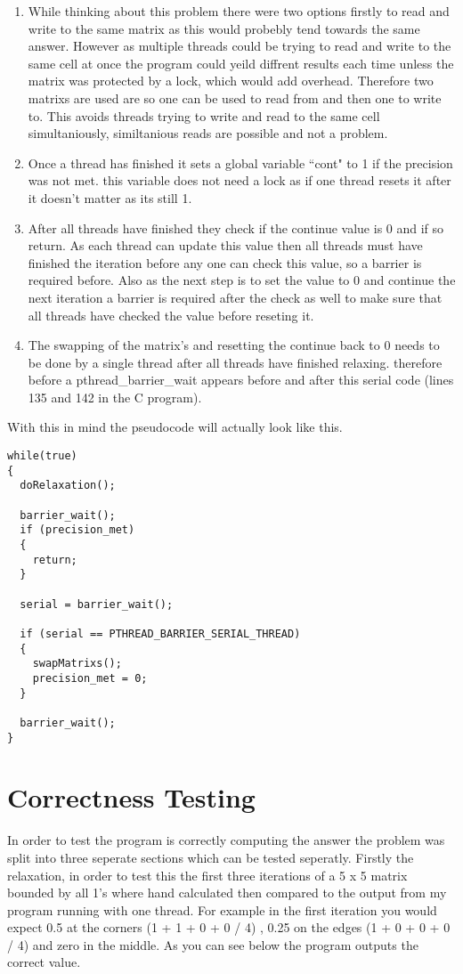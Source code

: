 \documentclass{article}
\begin{document}
\begin{enumerate}
\item While thinking about this problem there were two options firstly to read and write
to the same matrix as this would probebly tend towards the same answer. However
as multiple threads could be trying to read and write to the same cell at once the
program could yeild diffrent results each time unless the matrix was protected by a lock, which would add
overhead.
Therefore two matrixs are used are so one can be used to read from
and then one to write to. This avoids threads trying to write and read to the same cell simultaniously,
similtanious reads are possible and not a problem.\\
\item Once a thread has finished it sets a global variable ``cont" to 1 if the
precision was not met. this variable does not need a lock as if one thread resets
it after it doesn't matter as its still 1.
\item After all threads have finished they check if the continue value is 0 and if
so return. As each thread can update this value then all threads must have finished
the iteration before any one can check this value, so a barrier is required before.
Also as the next step is to set the value to 0 and continue the next iteration a barrier
is required after the check as well to make sure that all threads have checked the value
before reseting it.
\item The swapping of the matrix's and resetting the continue back to 0 needs to be
done by a single thread after all threads have finished relaxing. therefore before a
pthread\_barrier\_wait appears before and after this serial code (lines 135 and 142 in the C program).
\end{enumerate}

With this in mind the pseudocode will actually look like this.\\

\begin{lstlisting}
while(true)
{
  doRelaxation();

  barrier_wait();
  if (precision_met)
  {
    return;
  }

  serial = barrier_wait();

  if (serial == PTHREAD_BARRIER_SERIAL_THREAD)
  {
    swapMatrixs();
    precision_met = 0;
  }

  barrier_wait();
}
\end{lstlisting}

\newpage
\section{Correctness Testing}
In order to test the program is correctly computing the answer the problem was split
into three seperate sections which can be tested seperatly. Firstly the relaxation,
in order to test this the first three iterations of a 5 x 5 matrix bounded by all 1's
where hand calculated then compared to the output from my program running with one
thread. For example in the first iteration you would expect 0.5 at the corners (1 + 1 + 0 + 0 / 4)
, 0.25 on the edges (1 + 0 + 0 + 0 / 4) and zero in the middle. As you can see below the program outputs the correct
value.
\end{document}
